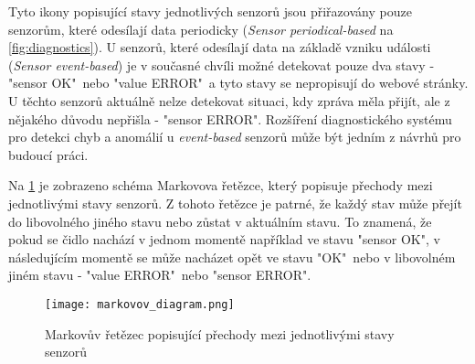 Tyto ikony popisující stavy jednotlivých senzorů jsou přiřazovány pouze senzorům, které odesílají data periodicky (\textit{Sensor periodical-based} na \cref{fig:diagnostics}). U senzorů, které odesílají data na základě vzniku události (\textit{Sensor event-based}) je v současné chvíli možné detekovat pouze dva stavy - "sensor OK"\ nebo "value ERROR"\ a tyto stavy se nepropisují do webové stránky. U těchto senzorů aktuálně nelze detekovat situaci, kdy zpráva měla přijít, ale z nějakého důvodu nepřišla - "sensor ERROR". Rozšíření diagnostického systému pro detekci chyb a anomálií u \textit{event-based} senzorů může být jedním z návrhů pro budoucí práci. \par
Na \cref{fig:markovov_diagram} je zobrazeno schéma Markovova řetězce, který popisuje přechody mezi jednotlivými stavy senzorů. Z tohoto řetězce je patrné, že každý stav může přejít do libovolného jiného stavu nebo zůstat v aktuálním stavu. To znamená, že pokud se čidlo nachází v jednom momentě například ve stavu "sensor OK", v následujícím momentě se může nacházet opět ve stavu "OK"\ nebo v libovolném jiném stavu - "value ERROR"\ nebo "sensor ERROR".

\begin{figure}[H]
  \centering
  \texttt{[image: markovov\_diagram.png]}
  \caption{Markovův řetězec popisující přechody mezi jednotlivými stavy senzorů}
  \label{fig:markovov_diagram}
\end{figure}  

